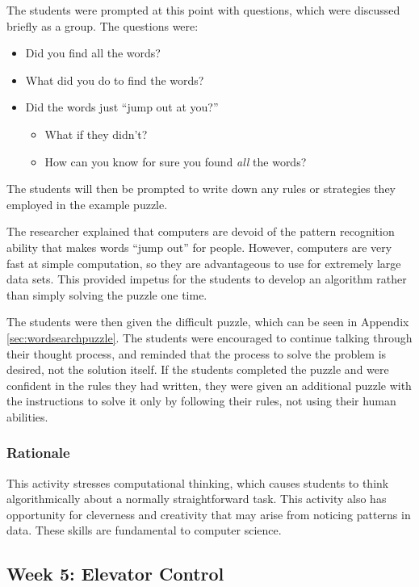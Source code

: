 	The students were prompted at this point with questions, which
	were discussed briefly as a group. The questions were:
	\begin{itemize}
	\item Did you find all the words?
	\item What did you do to find the words?
	\item Did the words just {}``jump out at you?'' 
	
	\begin{itemize}
	\item What if they didn't?
	\item How can you know for sure you found \emph{all} the words?
	\end{itemize}
	\end{itemize}
	The students will then be prompted to write down any rules or strategies
	they employed in the example puzzle. 
	
	The researcher explained that computers are devoid of the pattern
	recognition ability that makes words {}``jump out'' for people.
	However, computers are very fast at simple computation, so they are
	advantageous to use for extremely large data sets. This provided
	impetus for the students to develop an algorithm rather than simply
	solving the puzzle one time.
	
	The students were then given the difficult puzzle, which can be
	seen in Appendix \ref{sec:wordsearchpuzzle}. The students were encouraged
	to continue talking through their thought process, and reminded that
	the process to solve the problem is desired, not the solution itself.
	If the students completed the puzzle and were confident in the rules
	they had written, they were given an additional puzzle with the
	instructions to solve it only by following their rules, not using
	their human abilities.
	
	
	\subsubsection{Rationale}
	
	This activity stresses computational thinking,
	which causes students to think algorithmically about a normally straightforward
	task. This activity also has opportunity for cleverness and creativity
	that may arise from noticing patterns in data. These skills are fundamental
	to computer science. 

\subsection{Week 5: Elevator Control}

